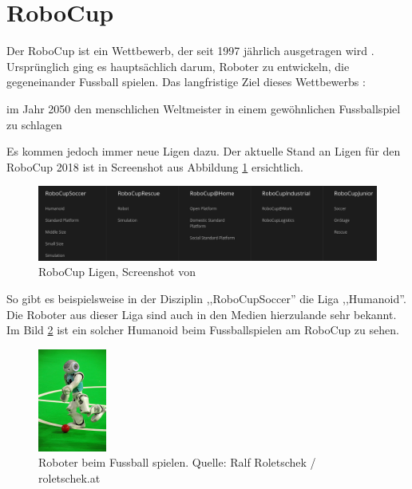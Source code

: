 \section{RoboCup}
Der RoboCup ist ein Wettbewerb, der seit 1997 jährlich ausgetragen wird \cite{wikipedia-robocup}. Ursprünglich ging es hauptsächlich darum, Roboter zu entwickeln, die gegeneinander Fussball spielen. Das langfristige Ziel dieses Wettbewerbs \cite{wikipedia-roboterfussball}: 
\begin{formal}
im Jahr 2050 den menschlichen Weltmeister in einem gewöhnlichen Fussballspiel zu schlagen
\end{formal}
Es kommen jedoch immer neue Ligen dazu. Der aktuelle Stand an Ligen für den RoboCup 2018 ist in Screenshot aus Abbildung \ref{fig:robocup_ligen} ersichtlich.
\begin{figure}[H]
	\centering
	\includegraphics[width=\textwidth]{img/robocup-ligen.png}
	\caption{RoboCup Ligen, Screenshot von \cite{www.robocup.org}}
	\label{fig:robocup_ligen}
\end{figure} 
So gibt es beispielsweise in der Disziplin ,,RoboCupSoccer'' die Liga ,,Humanoid''. Die Roboter aus dieser Liga sind auch in den Medien hierzulande sehr bekannt. Im Bild \ref{fig:robocup_fussball} ist ein solcher Humanoid beim Fussballspielen am RoboCup zu sehen.
\begin{figure}[H]
	\centering
	\includegraphics[width=0.2\textwidth]{img/robocup-humanoid.jpg}
	\caption{Roboter beim Fussball spielen. Quelle: Ralf Roletschek / roletschek.at \cite{robocup2013}}
	\label{fig:robocup_fussball}
\end{figure}
